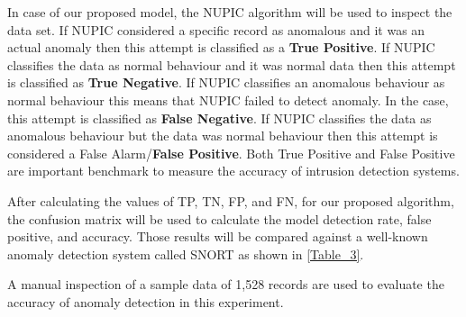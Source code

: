 \documentclass[sigconf]{acmart}
\begin{document}
In case of our proposed model, the NUPIC algorithm will be used to inspect the data set. If NUPIC considered a specific record as anomalous and it was an actual anomaly then this attempt is classified as a \textbf{True Positive}. If NUPIC classifies the data as normal behaviour and it was normal data then this attempt is classified as \textbf{True Negative}. If NUPIC classifies an anomalous behaviour as normal behaviour this means that NUPIC failed to detect anomaly. In the case, this attempt is classified as \textbf{False Negative}. If NUPIC classifies the data as anomalous behaviour but the data was normal behaviour then this attempt is considered a False Alarm/\textbf{False Positive}. Both True Positive and False Positive are important benchmark to measure the accuracy of intrusion detection systems. 

After calculating the values of TP, TN, FP, and FN, for our proposed algorithm, the confusion matrix will be used to calculate the model detection rate, false positive, and accuracy. Those results will be compared against a well-known anomaly detection system called SNORT as shown in \ref{Table_3}.   

A manual inspection of  a sample data of 1,528 records are used to evaluate the accuracy of anomaly detection in this experiment.  
\begin{table}[h!]
\centering

\caption{Results of the proposed anomalies detection model on confusion matrix}
\end{table}

 \begin{table}[h!]
\centering

\caption{Results of the SNORT anomaly detection on confusion matrix}
\end{table}
\end{document}
